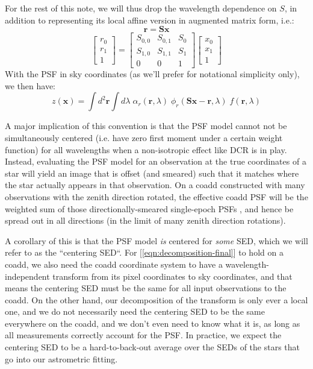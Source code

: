 \documentclass[DM,authoryear,toc]{lsstdoc}
\begin{document}
For the rest of this note, we will thus drop the wavelength dependence on $S$, in addition to representing its local affine version in augmented matrix form, i.e.:
\begin{equation}
  \mathbf{r} = \mathbf{S} \mathbf{x}
\end{equation}
\begin{equation}
\begin{bmatrix}
    r_0 \\
    r_1 \\
    1
  \end{bmatrix} =
  \begin{bmatrix}
    S_{0, 0} & S_{0, 1} & S_0 \\
    S_{1, 0} & S_{1, 1} & S_1 \\
    0 & 0 & 1
  \end{bmatrix}
  \begin{bmatrix}
    x_0 \\
    x_1 \\
    1
  \end{bmatrix}
\end{equation}
With the PSF in sky coordinates (as we'll prefer for notational simplicity only), we then have:
\begin{equation}
  z(\mathbf{x}) =  \int\!\! d^2 \mathbf{r} \int\!\! d\!\lambda
    \; \alpha_r(\mathbf{r}, \lambda)
    \; \phi_r\!\left(\mathbf{S}\mathbf{x} - \mathbf{r}, \lambda\right)
    \; f\!\left(\mathbf{r}, \lambda\right)
  \label{eqn:decomposition-final}
\end{equation}

A major implication of this convention is that the PSF model cannot not be simultaneously centered (i.e. have zero first moment under a certain weight function) for all wavelengths when a non-isotropic effect like DCR is in play.
Instead, evaluating the PSF model for an observation at the true coordinates of a star will yield an image that is offset (and smeared) such that it matches where the star actually appears in that observation.
On a coadd constructed with many observations with the zenith direction rotated, the effective coadd PSF will be the weighted sum of those directionally-smeared single-epoch PSFs \citep{2023OJAp....6E...5M}, and hence be spread out in all directions (in the limit of many zenith direction rotations).

A corollary of this is that the PSF model \emph{is} centered for \emph{some} SED, which we will refer to as the ``centering SED``.
For [\ref{eqn:decomposition-final}] to hold on a coadd, we also need the coadd coordinate system to have a wavelength-independent transform from its pixel coordinates to sky coordinates, and that means the centering SED must be the same for all input observations to the coadd.
On the other hand, our decomposition of the transform is only ever a local one, and we do not necessarily need the centering SED to be the same everywhere on the coadd, and we don't even need to know what it is, as long as  all measurements correctly account for the PSF.
In practice, we expect the centering SED to be a hard-to-back-out average over the SEDs of the stars that go into our astrometric fitting.
\end{document}
